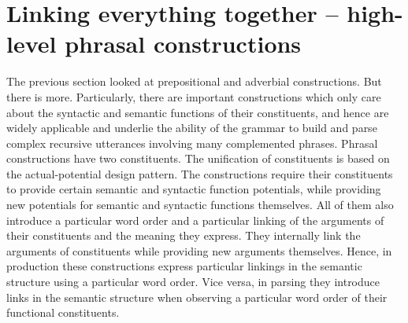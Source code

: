 \section{Linking everything together -- high-level phrasal constructions}
\label{s:phrasal}
The previous section looked at prepositional and adverbial constructions. 
But there is more. Particularly, there are important constructions which only care 
about the syntactic and semantic functions of their constituents, and hence are 
widely applicable and underlie the ability of the grammar to build and parse 
complex recursive utterances involving many complemented phrases. Phrasal 
constructions have two constituents. The unification of constituents is based on 
the actual-potential design pattern. The constructions require their constituents 
to provide certain semantic and syntactic function potentials, while providing 
new potentials for semantic and syntactic functions themselves. 
All of them also introduce a particular word order and a particular linking 
of the arguments of their constituents and the meaning they express. They internally link
the arguments of constituents while providing new arguments themselves.
Hence, in production these constructions express particular linkings in the semantic structure using a particular word order. Vice versa, in parsing they introduce links in the semantic structure when observing a particular word order
of their functional constituents. 

